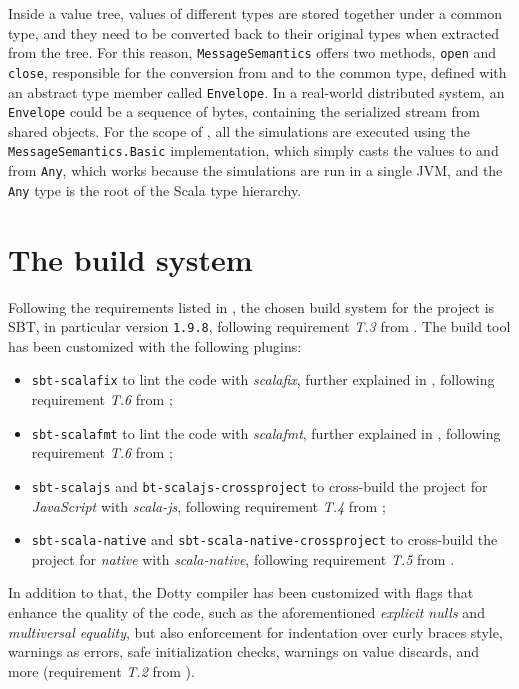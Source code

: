 Inside a value tree, values of different types are stored together under a common type, and they need to be converted back to their original types when extracted from the tree.
%
For this reason, \texttt{MessageSemantics} offers two methods, \texttt{open} and \texttt{close}, responsible for the conversion from and to the common type, defined with an abstract type member called \texttt{Envelope}.
%
In a real-world distributed system, an \texttt{Envelope} could be a sequence of bytes, containing the serialized stream from shared objects.
%
For the scope of \this, all the simulations are executed using the \texttt{MessageSemantics.Basic} implementation, which simply casts the values to and from \texttt{Any}, which works because the simulations are run in a single JVM, and the \texttt{Any} type is the root of the Scala type hierarchy.

\section{The build system}

Following the requirements listed in , the chosen build system for the project is \ac{SBT}, in particular version \texttt{1.9.8}, following requirement \textit{T.3} from .
%
The build tool has been customized with the following plugins:
\begin{itemize}
    \item \texttt{sbt-scalafix} to lint the code with \textit{scalafix}, further explained in , following requirement \textit{T.6} from ;
    \item \texttt{sbt-scalafmt} to lint the code with \textit{scalafmt}, further explained in , following requirement \textit{T.6} from ;
    \item \texttt{sbt-scalajs} and \texttt{bt-scalajs-crossproject} to cross-build the project for \textit{JavaScript} with \textit{scala-js}, following requirement \textit{T.4} from ;
    \item \texttt{sbt-scala-native} and \texttt{sbt-scala-native-crossproject} to cross-build the project for \textit{native} with \textit{scala-native}, following requirement \textit{T.5} from .
\end{itemize}
%
In addition to that, the Dotty compiler has been customized with flags that enhance the quality of the code, such as the aforementioned \textit{explicit nulls} and \textit{multiversal equality}, but also enforcement for indentation over curly braces style, warnings as errors, safe initialization checks, warnings on value discards, and more (requirement \textit{T.2} from ).

